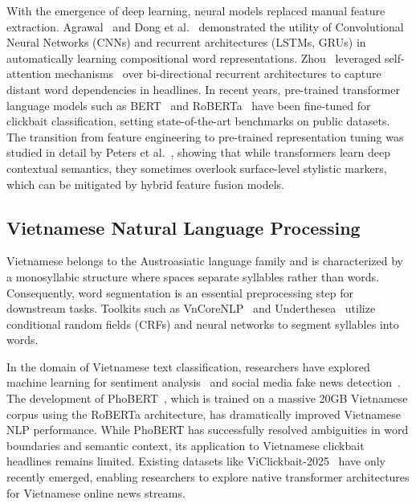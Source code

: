 \documentclass[conference]{IEEEtran}
\begin{document}
With the emergence of deep learning, neural models replaced manual feature extraction. Agrawal~\cite{agrawal2016clickbait} and Dong et al.~\cite{dong2019deep} demonstrated the utility of Convolutional Neural Networks (CNNs) and recurrent architectures (LSTMs, GRUs) in automatically learning compositional word representations. Zhou~\cite{zhou2017clickbait} leveraged self-attention mechanisms~\cite{vaswani2017attention} over bi-directional recurrent architectures to capture distant word dependencies in headlines. In recent years, pre-trained transformer language models such as BERT~\cite{devlin2019bert} and RoBERTa~\cite{liu2019roberta} have been fine-tuned for clickbait classification, setting state-of-the-art benchmarks on public datasets. The transition from feature engineering to pre-trained representation tuning was studied in detail by Peters et al.~\cite{peters2019tune}, showing that while transformers learn deep contextual semantics, they sometimes overlook surface-level stylistic markers, which can be mitigated by hybrid feature fusion models.

\subsection{Vietnamese Natural Language Processing}
Vietnamese belongs to the Austroasiatic language family and is characterized by a monosyllabic structure where spaces separate syllables rather than words. Consequently, word segmentation is an essential preprocessing step for downstream tasks. Toolkits such as VnCoreNLP~\cite{vu2018vncorenlp} and Underthesea~\cite{nguyen2019underthesea} utilize conditional random fields (CRFs) and neural networks to segment syllables into words.

In the domain of Vietnamese text classification, researchers have explored machine learning for sentiment analysis~\cite{nguyen2021vietnamese_sentiment} and social media fake news detection~\cite{le2021vietnamese_fake}. The development of PhoBERT~\cite{nguyen2020phobert}, which is trained on a massive 20GB Vietnamese corpus using the RoBERTa architecture, has dramatically improved Vietnamese NLP performance. While PhoBERT has successfully resolved ambiguities in word boundaries and semantic context, its application to Vietnamese clickbait headlines remains limited. Existing datasets like ViClickbait-2025~\cite{viclickbait2025} have only recently emerged, enabling researchers to explore native transformer architectures for Vietnamese online news streams.
\end{document}
